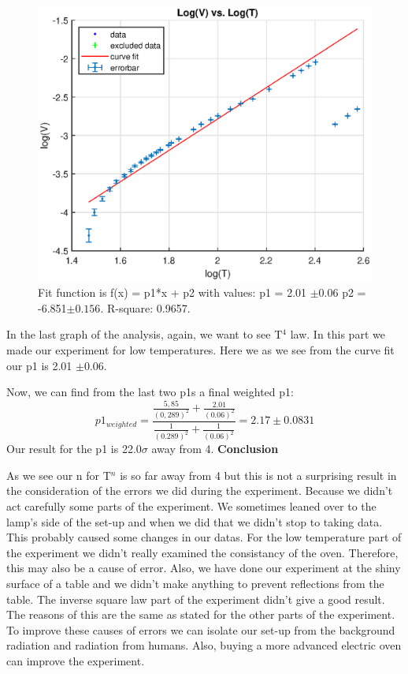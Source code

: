 \documentclass[11pt,a4paper]{article}
\begin{document}
{\begin{figure}[H]
\begin{center}
		\includegraphics[scale=0.7]{low.eps}
	\end{center}
	\caption{Fit function is f(x) = p1*x + p2 with values:   p1 =        2.01 $\pm0.06$ 
		p2 =      -6.851$ \pm0.156$. R-square: 0.9657.}
\end{figure}
In the last graph of the analysis, again, we want to see T$^4$ law. In this part we made our experiment for low temperatures. Here we as we see from the curve fit our p1 is 2.01 $\pm0.06$.
\par Now, we can find from the last two p1s a final weighted p1:
\begin{equation}
p1_{weighted}=\frac{\frac{5,85}{{\left(0,289\right)}^{2}}+\frac{2.01}{(0.06)^2}}{\frac{1}{{\left(0.289\right)}^{2}}+\frac{1}{(0.06)^2}}=2.17\pm0.0831
\end{equation}
Our result for the p1 is 22.0$\sigma$ away from 4.\newpage 
\textbf{Conclusion}\\[\baselineskip]
\par As we see our n for T$^n$ is so far away from 4  but this is not a surprising result in the consideration of the errors we did during the experiment. Because we didn't act carefully some parts of the experiment. We sometimes leaned over to the lamp's side of the set-up and when we did that we didn't stop to taking data. This probably caused some changes in our datas. For the low temperature part of the experiment we didn't really examined the consistancy of the oven. Therefore, this may also be a cause of error. Also, we have done our experiment at the shiny surface of a table and we didn't make anything to prevent reflections from the table. The inverse square law part of the experiment didn't give a good result. The reasons of this are the same as stated for the other parts of the experiment. To improve these causes of errors we can isolate our set-up from the background radiation and radiation from humans. Also, buying a more advanced electric oven can improve the experiment.
}
\end{document}
